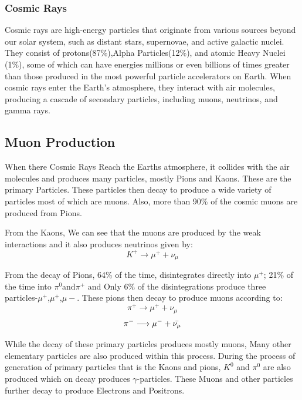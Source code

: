 \documentclass{article}
\begin{document}
\begin{multicols}{2}
\subsubsection{Cosmic Rays}
Cosmic rays are high-energy particles that originate from various sources beyond our solar system, such as distant stars, supernovae, and active galactic nuclei. They consist of  protons(87\%),Alpha Particles(12\%), and atomic Heavy Nuclei (1\%), some of which can have energies millions or even billions of times greater than those produced in the most powerful particle accelerators on Earth. When  cosmic rays enter the Earth's atmosphere, they interact with air molecules, producing a cascade  of secondary particles, including muons, neutrinos, and gamma rays.

\subsection{Muon Production}

When there Cosmic Rays Reach the Earths atmosphere, it collides with the air molecules and produces 
many particles, mostly Pions and Kaons. These are the primary Particles. These particles then decay to produce a wide variety
of particles most of which are muons. Also, more than 90\% of the cosmic muons are produced from Pions.

From the Kaons, We can see that the muons are produced by the weak interactions and it also produces neutrinos given by:
\begin{equation}
    K^{+} \longrightarrow \mu^{+} + \nu_{\mu}
\end{equation}

From the decay of Pions, 64\% of the time, disintegrates directly into $\mu^+$; 21\% of the time into $\pi^0$and$\pi^+$ and Only 6\% of the disintegrations produce three particles-$\mu^+$,$\mu^+$,$\mu-$. These pions then decay to produce muons according to:
\begin{equation}
    \pi^{+} \longrightarrow \mu^{+} + \nu_{\mu}
\end{equation}
\begin{equation}
    \pi^{-} \longrightarrow \mu^{-} + \Bar{\nu_{\mu}}
\end{equation}



While the decay of these primary particles produces mostly muons, Many other elementary particles are also produced
within this process. During the process of generation of primary particles that is the Kaons and pions, $K^0$ and $\pi^0$ are also produced
which on decay produces $\gamma$-particles. These Muons and other particles further decay to produce Electrons and Positrons.






\end{multicols}
\end{document}
